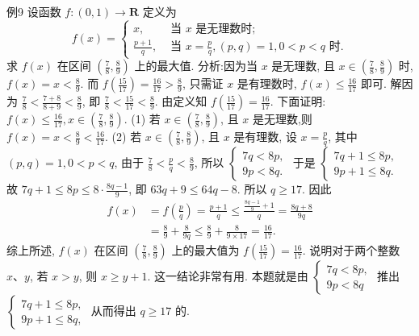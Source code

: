 例9 设函数 $f:(0,1) \rightarrow \mathbf{R}$ 定义为
$$
f(x)= \begin{cases}x, & \text { 当 } x \text { 是无理数时; } \\ \frac{p+1}{q}, & \text { 当 } x=\frac{p}{q},(p, q)=1,0<p<q \text { 时.
}\end{cases}
$$
求 $f(x)$ 在区间 $\left(\frac{7}{8}, \frac{8}{9}\right)$ 上的最大值.
分析:因为当 $x$ 是无理数, 且 $x \in\left(\frac{7}{8}, \frac{8}{9}\right)$ 时, $f(x)=x<\frac{8}{9}$. 而 $f\left(\frac{15}{17}\right)=\frac{16}{17}>\frac{8}{9}$, 只需证 $x$ 是有理数时, $f(x) \leqslant \frac{16}{17}$ 即可.
解因为 $\frac{7}{8}<\frac{7+8}{8+9}<\frac{8}{9}$, 即 $\frac{7}{8}<\frac{15}{17}<\frac{8}{9}$.
由定义知 $f\left(\frac{15}{17}\right)=\frac{16}{17}$. 下面证明: $f(x) \leqslant \frac{16}{17}, x \in\left(\frac{7}{8}, \frac{8}{9}\right)$.
(1) 若 $x \in\left(\frac{7}{8}, \frac{8}{9}\right)$, 且 $x$ 是无理数,则 $f(x)=x<\frac{8}{9}<\frac{16}{17}$.
(2) 若 $x \in\left(\frac{7}{8}, \frac{8}{9}\right)$, 且 $x$ 是有理数, 设 $x=\frac{p}{q}$, 其中 $(p, q)=1,0< p<q$, 由于 $\frac{7}{8}<\frac{p}{q}<\frac{8}{9}$, 所以 $\left\{\begin{array}{l}7 q<8 p, \\ 9 p<8 q .\end{array}\right.$ 于是 $\left\{\begin{array}{l}7 q+1 \leqslant 8 p, \\ 9 p+1 \leqslant 8 q .\end{array}\right.$ 故 $7 q+1 \leqslant 8 p \leqslant 8 \cdot \frac{8 q-1}{9}$, 即 $63 q+9 \leqslant 64 q-8$. 所以 $q \geqslant 17$. 因此
$$
\begin{aligned}
f(x) & =f\left(\frac{p}{q}\right)=\frac{p+1}{q} \leqslant \frac{\frac{8 q-1}{9}+1}{q}=\frac{8 q+8}{9 q} \\
& =\frac{8}{9}+\frac{8}{9 q} \leqslant \frac{8}{9}+\frac{8}{9 \times 17}=\frac{16}{17} .
\end{aligned}
$$
综上所述, $f(x)$ 在区间 $\left(\frac{7}{8}, \frac{8}{9}\right)$ 上的最大值为 $f\left(\frac{15}{17}\right)=\frac{16}{17}$.
说明对于两个整数 $x 、 y$, 若 $x>y$, 则 $x \geqslant y+1$. 这一结论非常有用.
本题就是由 $\left\{\begin{array}{l}7 q<8 p, \\ 9 p<8 q\end{array}\right.$ 推出 $\left\{\begin{array}{l}7 q+1 \leqslant 8 p, \\ 9 p+1 \leqslant 8 q,\end{array}\right.$ 从而得出 $q \geqslant 17$ 的.



